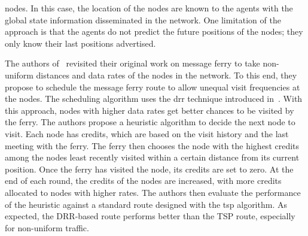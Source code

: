 nodes. In this case, the location of the nodes are known to the agents with the global state information disseminated in the network. One limitation of the approach is that the agents do not predict the future positions of the nodes; they only know their last positions advertised. 

The authors of~\cite{mansy2011deficit} revisited their original work on message ferry to take non-uniform distances and data rates of the nodes in the network. To this end, they propose to schedule the message ferry route to allow unequal visit frequencies at the nodes. The scheduling algorithm uses the \acrfull{drr} technique introduced in~\cite{shreedhar1995efficient}. With this approach, nodes with higher data rates get better chances to be visited by the ferry. The authors propose a heuristic algorithm to decide the next node to visit. Each node has credits, which are based on the visit history and the last meeting with the ferry. The ferry then chooses the node with the highest credits among the nodes least recently visited within a certain distance from its current position. Once the ferry has visited the node, its credits are set to zero. At the end of each round, the credits of the nodes are increased, with more credits allocated to nodes with higher rates. The authors then evaluate the performance of the heuristic against a standard route designed with the \acrshort{tsp} algorithm. As expected, the DRR-based route performs better than the TSP route, especially for non-uniform traffic.

